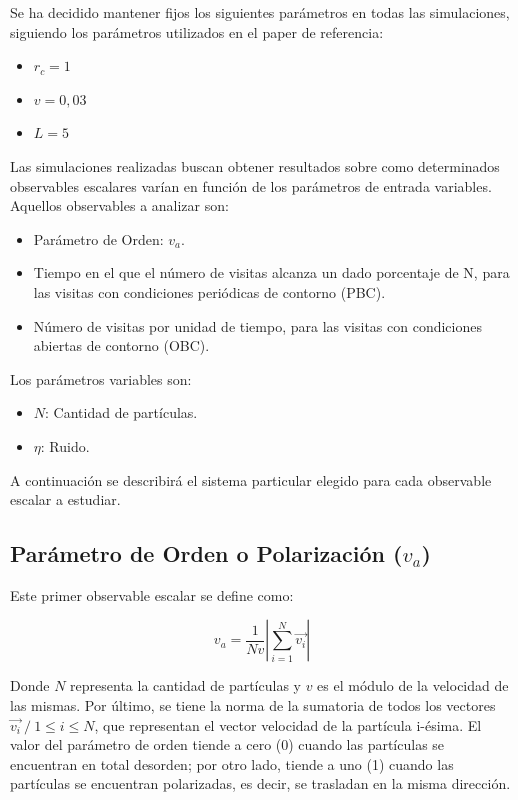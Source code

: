 \documentclass[11pt, a4paper]{article}
\begin{document}
        Se ha decidido mantener fijos los siguientes parámetros en todas las simulaciones, siguiendo los parámetros utilizados en el paper de referencia:
        \begin{itemize}
            \item $r_c = 1$
            \item $v = 0,03$
            \item $L = 5$
        \end{itemize}

        Las simulaciones realizadas buscan obtener resultados sobre como determinados observables escalares varían
        en función de los parámetros de entrada variables.
        Aquellos observables a analizar son:
        \begin{itemize}
            \item Parámetro de Orden: $v_a$.
            \item Tiempo en el que el número de visitas alcanza un dado porcentaje de N, para las visitas con condiciones periódicas de contorno (PBC).
            \item Número de visitas por unidad de tiempo, para las visitas con condiciones abiertas de contorno (OBC).
        \end{itemize}

        Los parámetros variables son:

        \begin{itemize}
            \item $N$: Cantidad de partículas.
            \item $\eta$: Ruido.
        \end{itemize}

        A continuación se describirá el sistema particular elegido para cada observable escalar a estudiar.

        \subsection{Parámetro de Orden o Polarización ($v_a$)}
        \label{subsec:polarizacion}

            Este primer observable escalar se define como:

            \begin{equation}
                v_a = \frac{1}{Nv} \left|\sum_{i=1}^{N} \vec{v_i} \right|
            \end{equation}

            Donde $N$ representa la cantidad de partículas y $v$ es el módulo de la velocidad de las mismas.
            Por último, se tiene la norma de la sumatoria de todos los vectores $\vec{v_i} \ / \  1 \le i \le N$,
            que representan el vector velocidad de la partícula i-ésima.
            El valor del parámetro de orden tiende a cero (0) cuando las partículas se encuentran en total desorden;
            por otro lado, tiende a uno (1) cuando las partículas se encuentran polarizadas, es decir, se trasladan en la misma dirección.
\end{document}
